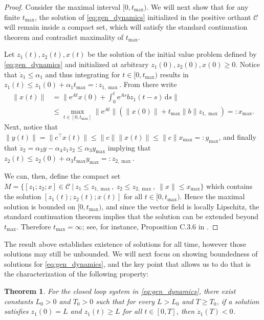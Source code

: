 \documentclass{article}
\newtheorem{theorem}{Theorem}
\newcommand{\e}{\mbox{e}}
\begin{document}
\begin{proof}
    Consider the maximal interval $[0,t_{\max})$. We will next show that for any finite $t_{\max}$, the solution of \eqref{eq:gen_dynamics} initialized in the positive orthant $\mathcal{C}$ will remain inside a compact set, which will satisfy the standard continuation theorem and contradict maximality of $t_{\max}$.

    Let $z_1(t),z_2(t),x(t)$ be the solution of the initial value problem defined by \eqref{eq:gen_dynamics} and initialized at arbitrary $z_1(0),z_2(0),x(0)\ge0$. Notice that $\dot z_1\leq \alpha_1$ and thus integrating for $t\in[0,t_{\max})$ results in $z_1(t)\leq z_1(0)+\alpha_1t_{\max}=:z_{1,\max}$. From there write
    \begin{align*}
        \|x(t)\| &= \|\e^{At}x(0)+\int_0^t\e^{As}bz_1(t-s)\,\mbox{d}s\|\\
        &\leq \max_{t\in[0,t_{\max}]}\|\e^{At}\|\left(\|x(0)\|+t_{\max}\|b\|z_{1,\max}\right)=:x_{\max}.
    \end{align*}
    Next, notice that $\|y(t)\| = \|c^\top x(t)\|\leq \|c\|\|x(t)\|\leq \|c\|x_{\max}=:y_{\max}$, and finally that $\dot z_2 = \alpha_3 y - \alpha_4z_1z_2\leq \alpha_3 y_{\max}$ implying that $z_2(t)\leq z_2(0)+\alpha_3t_{\max}y_{\max}=:z_{2,\max}$. 

    We can, then, define the compact set $M = \{[z_1;z_2;x]\in\mathcal{C}~|~z_1\leq z_{1,\max},~z_2\le z_{2,\max},~\|x\|\leq x_{\max}\}$ which contains the solution $[z_1(t);z_2(t);x(t)]$ for all $t\in[0,t_{\max})$. Hence the maximal solution is bounded on $[0,t_{\max})$, and since the vector field is locally Lipschitz, the standard continuation theorem implies that the solution can be extended beyond $t_{\max}$. Therefore $t_{\max}=\infty$; see, for instance, Proposition C.3.6 in \cite{mct}.
\end{proof}

The result above establishes existence of solutions for all time, however those solutions may still be unbounded. We will next focus on showing boundedness of solutions for \eqref{eq:gen_dynamics}, and the key point that allows us to do that is the characterization of the following property:

\begin{theorem}
    \label{thm:GenLin-HasProperty}
    For the closed loop system in \eqref{eq:gen_dynamics}, there exist constants $L_0>0$ and $T_0>0$ such that for every $L>L_0$ and $T\geq T_0$, if a solution satisfies $z_1(0)=L$ and $z_1(t)\geq L$ for all $t\in [0,T]$, then $\dot z_1(T)<0$.
\end{theorem}
\end{document}
